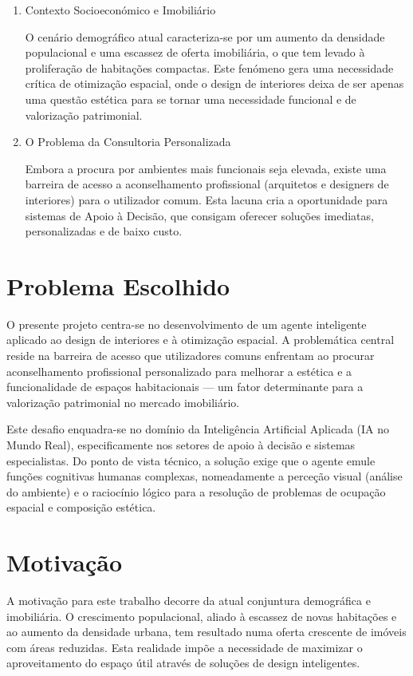 \documentclass[a4paper,12pt]{scrreprt}
\begin{document}
    \begin{enumerate}
        \item Contexto Socioeconómico e Imobiliário

        O cenário demográfico atual caracteriza-se por um aumento da densidade populacional e uma escassez de oferta imobiliária, o que tem levado à proliferação de habitações compactas. Este fenómeno gera uma necessidade crítica de otimização espacial, onde o design de interiores deixa de ser apenas uma questão estética para se tornar uma necessidade funcional e de valorização patrimonial.

        \item O Problema da Consultoria Personalizada

        Embora a procura por ambientes mais funcionais seja elevada, existe uma barreira de acesso a aconselhamento profissional (arquitetos e designers de interiores) para o utilizador comum. Esta lacuna cria a oportunidade para sistemas de Apoio à Decisão, que consigam oferecer soluções imediatas, personalizadas e de baixo custo.
    \end{enumerate}

    \section{Problema Escolhido}
        O presente projeto centra-se no desenvolvimento de um agente inteligente aplicado ao design de interiores e à otimização espacial. A problemática central reside na barreira de acesso que utilizadores comuns enfrentam ao procurar aconselhamento profissional personalizado para melhorar a estética e a funcionalidade de espaços habitacionais — um fator determinante para a valorização patrimonial no mercado imobiliário.

        Este desafio enquadra-se no domínio da Inteligência Artificial Aplicada (IA no Mundo Real), especificamente nos setores de apoio à decisão e sistemas especialistas. Do ponto de vista técnico, a solução exige que o agente emule funções cognitivas humanas complexas, nomeadamente a perceção visual (análise do ambiente) e o raciocínio lógico para a resolução de problemas de ocupação espacial e composição estética.
    \section{Motivação}
        A motivação para este trabalho decorre da atual conjuntura demográfica e imobiliária. O crescimento populacional, aliado à escassez de novas habitações e ao aumento da densidade urbana, tem resultado numa oferta crescente de imóveis com áreas reduzidas. Esta realidade impõe a necessidade de maximizar o aproveitamento do espaço útil através de soluções de design inteligentes.
\end{document}
